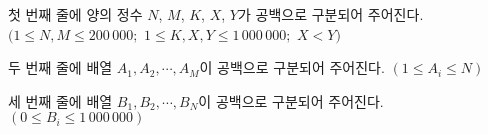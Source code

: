 첫 번째 줄에 양의 정수 $N$, $M$, $K$, $X$, $Y$가 공백으로 구분되어 주어진다. $(1 \le N, M \le 200\,000;$ $1 \le K, X, Y \le 1\,000\,000;$ $X < Y)$

두 번째 줄에 배열 $A_1, A_2, \cdots, A_M$이 공백으로 구분되어 주어진다. $(1 \le A_i \le N)$

세 번째 줄에 배열 $B_1, B_2, \cdots, B_N$이 공백으로 구분되어 주어진다. $(0 \le B_i \le 1\,000\,000)$
